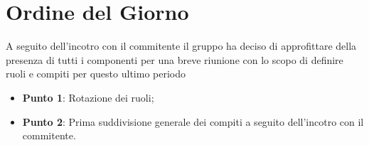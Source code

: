 \section{Ordine del Giorno}
A seguito dell'incotro con il commitente il gruppo ha deciso di approfittare della presenza di tutti i componenti per una breve riunione con lo scopo di definire ruoli e compiti per questo ultimo periodo
\begin{itemize}
	\item \textbf{Punto 1}: Rotazione dei ruoli;
	\item \textbf{Punto 2}: Prima suddivisione generale dei compiti a seguito dell'incotro con il commitente.
\end{itemize}